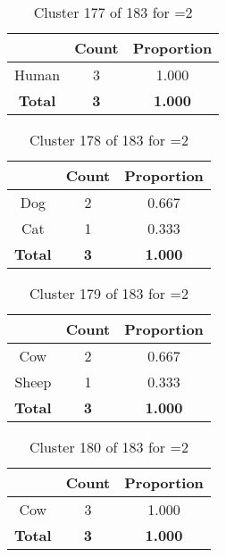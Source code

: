 \begin{table}[ht!]
\centering
\begin{tabular}{|c|c|c|}
\hline
\bf \Spec{} &\bf Count &\bf Proportion\\ \hline \hline
Human & 3 & 1.000\\ \hline
\hline
\bf Total & \bf 3 & \bf 1.000\\ \hline
\end{tabular}
\label{tab:cluster:177:2}
\caption{Cluster 177 of 183 for \minneigh{}=2}
\end{table}

\begin{table}[ht!]
\centering
\begin{tabular}{|c|c|c|}
\hline
\bf \Spec{} &\bf Count &\bf Proportion\\ \hline \hline
Dog & 2 & 0.667\\ \hline
Cat & 1 & 0.333\\ \hline
\hline
\bf Total & \bf 3 & \bf 1.000\\ \hline
\end{tabular}
\label{tab:cluster:178:2}
\caption{Cluster 178 of 183 for \minneigh{}=2}
\end{table}

\begin{table}[ht!]
\centering
\begin{tabular}{|c|c|c|}
\hline
\bf \Spec{} &\bf Count &\bf Proportion\\ \hline \hline
Cow & 2 & 0.667\\ \hline
Sheep & 1 & 0.333\\ \hline
\hline
\bf Total & \bf 3 & \bf 1.000\\ \hline
\end{tabular}
\label{tab:cluster:179:2}
\caption{Cluster 179 of 183 for \minneigh{}=2}
\end{table}

\clearpage
\begin{table}[ht!]
\centering
\begin{tabular}{|c|c|c|}
\hline
\bf \Spec{} &\bf Count &\bf Proportion\\ \hline \hline
Cow & 3 & 1.000\\ \hline
\hline
\bf Total & \bf 3 & \bf 1.000\\ \hline
\end{tabular}
\label{tab:cluster:180:2}
\caption{Cluster 180 of 183 for \minneigh{}=2}
\end{table}

